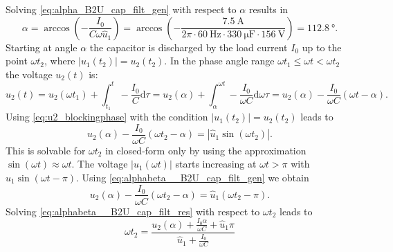 \begin{solutionblock}
\begin{equation}
    \end{equation}    
    Solving \eqref{eq:alpha_B2U_cap_filt_gen} with respect to $\alpha$ results in
    \begin{equation}
        \alpha = \arccos\left(-\frac{I_\mathrm{0}}{C\omega \hat{u}_1}\right) = 
        \arccos(-\frac{\SI{7.5}{\ampere}}{2 \pi \cdot \SI{60}{\hertz} \cdot \SI{330}{\micro\farad} \cdot \SI{156}{\volt}}) = \SI{112.8}{\degree}.
        \label{eq:alpha_B2U_cap_filt_res}
    \end{equation}    
    Starting at angle $\alpha$ the capacitor is discharged by the load current $I_\mathrm{0}$ up to the point 
    $\omega t_2$, where $\left| u_\mathrm{1}(t_2) \right|=u_\mathrm{2}(t_2)$.
    In the phase angle range $\omega t_1 \leq \omega t < \omega t_2$ the voltage $u_\mathrm{2}(t)$ is:
    \begin{equation}
        u_\mathrm{2}(t) = u_2(\omega t_1) + \int_{t_1}^t -\frac{I_0}{C} \mathrm{d} \tau 
        = u_\mathrm{2}(\alpha) + \int_{\alpha}^{\omega t} -\frac{I_0}{\omega C} \mathrm{d} \omega \tau
        =  u_\mathrm{2}(\alpha) - \frac{I_\mathrm{0}}{\omega C} (\omega t - \alpha).
        \label{eq:u2_blockingphase}
    \end{equation}
    Using \eqref{eq:u2_blockingphase} with the condition $\left| u_\mathrm{1}(t_\mathrm{2}) \right|=u_\mathrm{2}(t_\mathrm{2})$ leads to
    \begin{equation}
        u_\mathrm{2}(\alpha) - \frac{I_\mathrm{0}}{\omega C} (\omega t_\mathrm{2} - \alpha) = \left| \hat{u}_\mathrm{1}\sin(\omega t_\mathrm{2})\right|.
        \label{eq:alphabeta__B2U_cap_filt_gen}
    \end{equation}
    This is solvable for $\omega t_\mathrm{2}$ in closed-form only by using the approximation $\sin(\omega t) \approx \omega t$. The voltage 
    $\left| u_\mathrm{1}(\omega t)\right|$ starts increasing at $\omega t > \pi$ with $\hat{u}_\mathrm{1} \sin(\omega t - \pi)$.
    Using  \eqref{eq:alphabeta__B2U_cap_filt_gen} we obtain
    \begin{equation}
        u_2(\alpha) - \frac{I_\mathrm{0}}{\omega C} (\omega t_\mathrm{2} - \alpha) = \hat{u}_\mathrm{1}(\omega t_\mathrm{2} - \pi).
        \label{eq:alphabeta__B2U_cap_filt_res}
    \end{equation}
    Solving \eqref{eq:alphabeta__B2U_cap_filt_res} with respect to $\omega t_\mathrm{2}$ leads to
    \begin{equation}
        \omega t_\mathrm{2} = \frac{u_2(\alpha) + \frac{I_\mathrm{0}\alpha}{\omega C} + \hat{u}_\mathrm{1} \pi}{\hat{u}_\mathrm{1} + \frac{I_\mathrm{0}}{\omega C}}

\end{equation}
\end{solutionblock}

